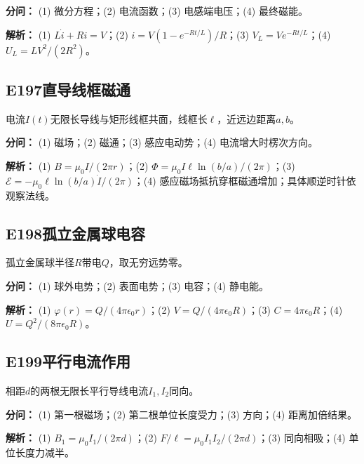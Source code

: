 \par\textbf{分问：} (1) 微分方程；(2) 电流函数；(3) 电感端电压；(4) 最终磁能。

\par\textbf{解析：} (1) $L\dot i+Ri=V$；(2) $i=V(1-e^{-Rt/L})/R$；(3) $V_L=Ve^{-Rt/L}$；(4) $U_L=LV^2/(2R^2)$。

\medskip

\subsection*{E197\quad 直导线框磁通}

电流$I(t)$无限长导线与矩形线框共面，线框长$\ell$，近远边距离$a,b$。

\par\textbf{分问：} (1) 磁场；(2) 磁通；(3) 感应电动势；(4) 电流增大时楞次方向。

\par\textbf{解析：} (1) $B=\mu_0I/(2\pi r)$；(2) $\Phi=\mu_0I\ell\ln(b/a)/(2\pi)$；(3) $\mathcal E=-\mu_0\ell\ln(b/a)\dot I/(2\pi)$；(4) 感应磁场抵抗穿框磁通增加；具体顺逆时针依观察法线。

\medskip

\subsection*{E198\quad 孤立金属球电容}

孤立金属球半径$R$带电$Q$，取无穷远势零。

\par\textbf{分问：} (1) 球外电势；(2) 表面电势；(3) 电容；(4) 静电能。

\par\textbf{解析：} (1) $\varphi(r)=Q/(4\pi\epsilon_0r)$；(2) $V=Q/(4\pi\epsilon_0R)$；(3) $C=4\pi\epsilon_0R$；(4) $U=Q^2/(8\pi\epsilon_0R)$。

\medskip

\subsection*{E199\quad 平行电流作用}

相距$d$的两根无限长平行导线电流$I_1,I_2$同向。

\par\textbf{分问：} (1) 第一根磁场；(2) 第二根单位长度受力；(3) 方向；(4) 距离加倍结果。

\par\textbf{解析：} (1) $B_1=\mu_0I_1/(2\pi d)$；(2) $F/\ell=\mu_0I_1I_2/(2\pi d)$；(3) 同向相吸；(4) 单位长度力减半。

